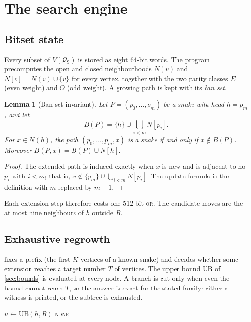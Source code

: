 \documentclass[11pt,a4paper]{article}
\newtheorem{lemma}[theorem]{Lemma}
\theoremstyle{definition}
\newcommand{\Q}{\mathcal{Q}}
\newcommand{\N}{N}
\begin{document}
\section{The search engine}\label{sec:engine}

\subsection{Bitset state}
Every subset of $V(\Q_9)$ is stored as eight 64-bit words. The program precomputes the open and closed neighbourhoods $\N(v)$ and $\N[v]=\N(v)\cup\{v\}$ for every vertex, together with the two parity classes $E$ (even weight) and $O$ (odd weight). A growing path is kept with its \emph{ban set}.

\begin{lemma}[Ban-set invariant]\label{lem:ban}
Let $P=(p_0,\dots,p_m)$ be a snake with head $h=p_m$, and let
\[
B(P)=\{h\}\cup\bigcup_{i<m}\N[p_i].
\]
For $x\in\N(h)$, the path $(p_0,\dots,p_m,x)$ is a snake if and only if $x\notin B(P)$. Moreover $B(P,x)=B(P)\cup\N[h]$.
\end{lemma}

\begin{proof}
The extended path is induced exactly when $x$ is new and is adjacent to no $p_i$ with $i<m$; that is, $x\notin\{p_m\}\cup\bigcup_{i<m}\N[p_i]$. The update formula is the definition with $m$ replaced by $m+1$.
\end{proof}

Each extension step therefore costs one 512-bit \textsc{or}. The candidate moves are the at most nine neighbours of $h$ outside $B$.

\subsection{Exhaustive regrowth}
 fixes a prefix (the first $K$ vertices of a known snake) and decides whether some extension reaches a target number $T$ of vertices. The upper bound $\mathrm{UB}$ of \cref{sec:bounds} is evaluated at every node. A branch is cut only when even the bound cannot reach $T$, so the answer is exact for the stated family: either a witness is printed, or the subtree is exhausted.

\begin{algorithm}[ht]
\caption{\textsc{Regrow}$(P,T)$: does some snake extending $P$ have $\ge T$ vertices?}\label{alg:regrow}
$u\leftarrow \mathrm{UB}(h,B)$
\ForEach{$x\in\N(h)\setminus B$}{
  \If{\textsc{Regrow}$\bigl(P\cdot x,\;B\cup\N[h]\bigr)$ found $Q$}{\Return \textsc{found}$(Q)$}
}
\Return \textsc{none}
\end{algorithm}
\end{document}
